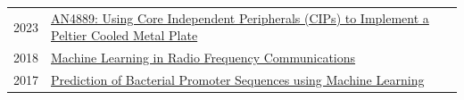 \documentclass[
	10pt, %
]{FreemanCV}
\begin{document}
\begin{paracol}{2}

\begin{supertabular}{p{0.05\linewidth} p{0.95\linewidth}} %
	
	2023 & \href{
	https://ww1.microchip.com/downloads/aemDocuments/documents/MCU08/ApplicationNotes/ApplicationNotes/AN4889-Using-CIPs-To-Implement-Peltier-Plate-DS00004889.pdf
	}{
	AN4889: Using Core Independent Peripherals (CIPs) to Implement a Peltier Cooled Metal Plate
	\scriptsize\faLink} \\
	2018 & \href{
	http://joshbooth.us/wp-content/uploads/2023/08/Machine-Learning-in-Radio-Frequency-Communications.pdf
	}{
	Machine Learning in Radio Frequency Communications
	\scriptsize\faLink} \\
	2017 & \href{
	http://joshbooth.us/wp-content/uploads/2023/08/poster_SBME_promoter_predictions.pdf
	}{
	Prediction of Bacterial Promoter Sequences using Machine Learning
	\scriptsize\faLink} \\
	
\end{supertabular}

\medskip %





\switchcolumn %



\end{paracol}
\end{document}
